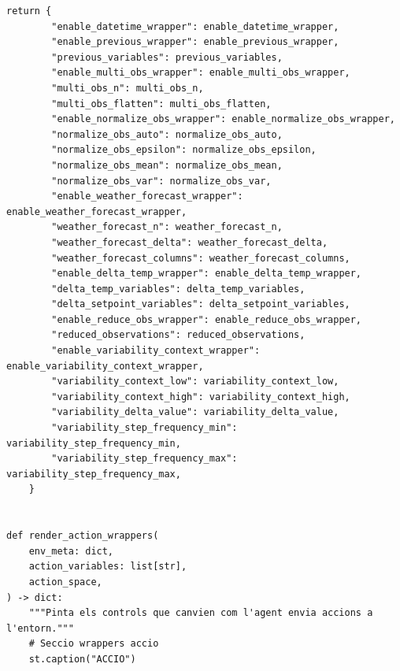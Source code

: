 \documentclass[10pt,a4paper]{article}
\begin{document}
\begin{lstlisting}[style=studioPython,caption={page\_components/training\_wrappers.py},label={lst:page-components-training-wrappers-py}]
    return {
        "enable_datetime_wrapper": enable_datetime_wrapper,
        "enable_previous_wrapper": enable_previous_wrapper,
        "previous_variables": previous_variables,
        "enable_multi_obs_wrapper": enable_multi_obs_wrapper,
        "multi_obs_n": multi_obs_n,
        "multi_obs_flatten": multi_obs_flatten,
        "enable_normalize_obs_wrapper": enable_normalize_obs_wrapper,
        "normalize_obs_auto": normalize_obs_auto,
        "normalize_obs_epsilon": normalize_obs_epsilon,
        "normalize_obs_mean": normalize_obs_mean,
        "normalize_obs_var": normalize_obs_var,
        "enable_weather_forecast_wrapper": enable_weather_forecast_wrapper,
        "weather_forecast_n": weather_forecast_n,
        "weather_forecast_delta": weather_forecast_delta,
        "weather_forecast_columns": weather_forecast_columns,
        "enable_delta_temp_wrapper": enable_delta_temp_wrapper,
        "delta_temp_variables": delta_temp_variables,
        "delta_setpoint_variables": delta_setpoint_variables,
        "enable_reduce_obs_wrapper": enable_reduce_obs_wrapper,
        "reduced_observations": reduced_observations,
        "enable_variability_context_wrapper": enable_variability_context_wrapper,
        "variability_context_low": variability_context_low,
        "variability_context_high": variability_context_high,
        "variability_delta_value": variability_delta_value,
        "variability_step_frequency_min": variability_step_frequency_min,
        "variability_step_frequency_max": variability_step_frequency_max,
    }


def render_action_wrappers(
    env_meta: dict,
    action_variables: list[str],
    action_space,
) -> dict:
    """Pinta els controls que canvien com l'agent envia accions a l'entorn."""
    # Seccio wrappers accio
    st.caption("ACCIO")


\end{lstlisting}
\end{document}
